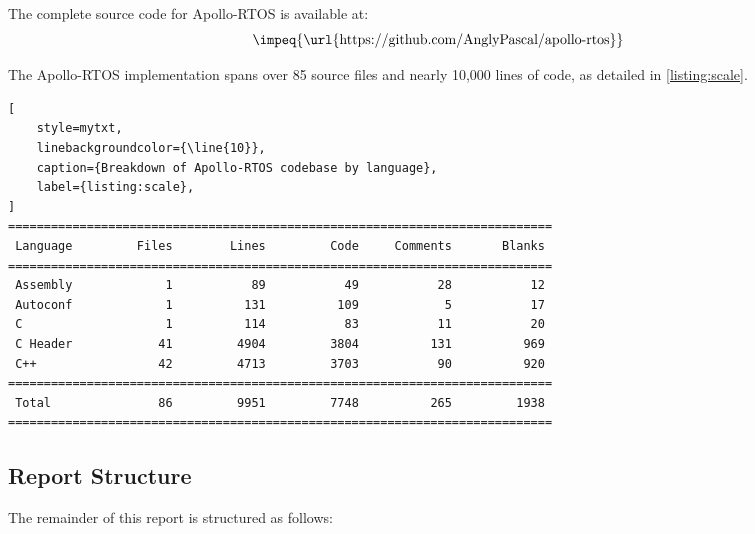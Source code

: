 The complete source code for Apollo-RTOS is available at:
\[
   \impeq{\text{\url{https://github.com/AnglyPascal/apollo-rtos}}}
\]



\vspace{1em}%

The Apollo-RTOS implementation spans over 85 source files and nearly 10,000 lines of
code, as detailed in \autoref{listing:scale}.
\vspace{-1.7em}
\begin{center}
\begin{minipage}{.95\linewidth}
\begin{lstlisting}[
    style=mytxt,
    linebackgroundcolor={\line{10}},
    caption={Breakdown of Apollo-RTOS codebase by language},
    label={listing:scale},
]
============================================================================
 Language         Files        Lines         Code     Comments       Blanks
============================================================================
 Assembly             1           89           49           28           12
 Autoconf             1          131          109            5           17
 C                    1          114           83           11           20
 C Header            41         4904         3804          131          969
 C++                 42         4713         3703           90          920
============================================================================
 Total               86         9951         7748          265         1938
============================================================================
\end{lstlisting}
\end{minipage}
\end{center}

\newpage
\subsection{Report Structure}

The remainder of this report is structured as follows:

